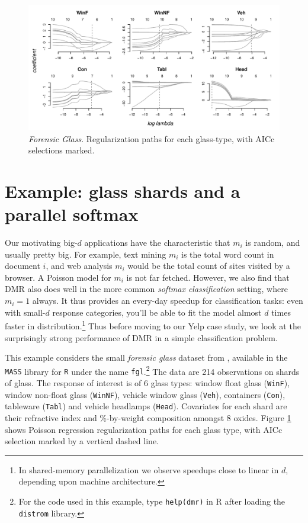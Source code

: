 \documentclass[12pt]{article}
\newcommand{\cd}[1]{{\tt#1}}
\begin{document}
\begin{figure}
\includegraphics[width=6.25in]{fgl_coef}
\caption{\label{fgl_coef} {\it Forensic Glass}. Regularization paths for each glass-type, with AICc selections marked.}
\end{figure}


\section{Example: glass shards and a parallel softmax}
\label{FGL}


Our motivating big-$d$ applications have the characteristic that $m_i$ is
random, and usually pretty big.  For example, text mining $m_i$ is the total
word count in document $i$, and web analysis $m_i$ would be the total count of
sites visited by a browser.  A Poisson model for $m_i$ is not far fetched.
However, we also find that DMR also does well in the more common {\it
softmax classification} setting, where $m_i=1$ always. It thus provides an
every-day speedup for classification tasks: even with small-$d$ response
categories, you'll be able to fit the model almost $d$ times faster in
distribution.\footnote{In shared-memory parallelization we observe
speedups close to linear in $d$, depending upon machine
architecture.} Thus before moving to our Yelp case study, we look at the
surprisingly strong performance of DMR in a simple classification problem.


This example considers the small {\it forensic glass} dataset from
\citet{venables_modern_2002}, available in the \cd{MASS} library for \cd{R}
under the name \cd{fgl}.\footnote{For the code used in this example, type
\cd{help(dmr)} in R after loading the \cd{distrom} library.}  The data are 214
observations on shards of glass. The response of interest is of 6 glass types:
window float glass (\cd{WinF}), window non-float glass (\cd{WinNF}), vehicle
window glass (\cd{Veh}), containers (\cd{Con}), tableware (\cd{Tabl}) and
vehicle headlamps (\cd{Head}).  Covariates for each shard are their refractive
index and \%-by-weight composition amongst 8 oxides. Figure \ref{fgl_coef}
shows Poisson regression regularization paths for each glass type,
with AICc selection marked by a vertical dashed line.
\end{document}
